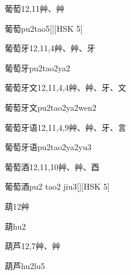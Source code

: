 \begin{Entry}{葡萄}{12,11}{⾋、⾋}
  \begin{Phonetics}{葡萄}{pu2tao5}[][HSK 5]
  \end{Phonetics}
\end{Entry}

\begin{Entry}{葡萄牙}{12,11,4}{⾋、⾋、⽛}
  \begin{Phonetics}{葡萄牙}{pu2tao2ya2}
  \end{Phonetics}
\end{Entry}

\begin{Entry}{葡萄牙文}{12,11,4,4}{⾋、⾋、⽛、⽂}
  \begin{Phonetics}{葡萄牙文}{pu2tao2ya2wen2}
  \end{Phonetics}
\end{Entry}

\begin{Entry}{葡萄牙语}{12,11,4,9}{⾋、⾋、⽛、⾔}
  \begin{Phonetics}{葡萄牙语}{pu2tao2ya2yu3}
  \end{Phonetics}
\end{Entry}

\begin{Entry}{葡萄酒}{12,11,10}{⾋、⾋、⾣}
  \begin{Phonetics}{葡萄酒}{pu2 tao2 jiu3}[][HSK 5]
  \end{Phonetics}
\end{Entry}

\begin{Entry}{葫}{12}{⾋}
  \begin{Phonetics}{葫}{hu2}
  \end{Phonetics}
\end{Entry}

\begin{Entry}{葫芦}{12,7}{⾋、⾋}
  \begin{Phonetics}{葫芦}{hu2lu5}
  \end{Phonetics}
\end{Entry}

